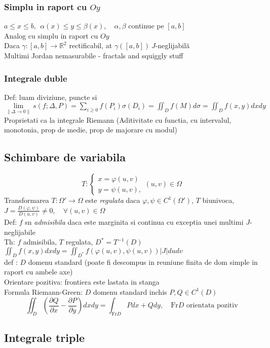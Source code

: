 \documentclass{article}
\newcommand{\parti}[2]{\frac{\partial #1}{ \partial #2}}
\newcommand*{\R}{\mathbb{R}}
\begin{document}
\subsubsection*{Simplu in raport cu $Oy$}
$ a\le x \le b,\ \ \alpha(x)\le y \le \beta(x), \quad \alpha, \beta $ continue pe $[a, b]$ \\
Analog cu simplu in raport cu $Oy$\\
Daca $\gamma: [a, b] \to \R^2$ rectificabil, at $\gamma([a, b])\ J$-neglijabilă\\
Multimi Jordan nemasurabile - fractals and squiggly stuff
\subsubsection*{Integrale duble}
Def: luam diviziune, puncte si $\displaystyle \lim\limits_{\|\Delta\to 0\|}s(f;\Delta, P) = \sum_{i\ge 0} f(P_i)\sigma(D_i)=\iint_Df(M)d\sigma=\iint_Df(x,y)dxdy$\\
Proprietati ca la integrale Riemann
(Aditivitate cu functia, cu intervalul, monotonia, prop de medie, prop de majorare cu modul)
\subsection*{Schimbare de variabila}
\[
  T: \begin{cases}
    x = \varphi(u, v)\\
    y = \psi(u, v),
  \end{cases}
   (u, v) \in \Omega
\]
Transformarea $T:\Omega'\to\Omega$ este \emph{regulata} daca $\varphi, \psi \in C^1(\Omega')$, $T$ biunivoca, $J = \frac{D(\varphi, \psi)}{D(u, v)} \neq 0, \quad
\forall (u, v) \in \Omega$\\
Def: $f$ sn \emph{admisibila} daca este marginita si continua cu exceptia unei multimi $J$-neglijabile\\
Th: $f$ admisibila, $T$ regulata, $D^* = T^{-1}(D)$\quad $\displaystyle \iint_D f(x, y) dxdy = \iint_{D^*} f(\varphi(u, v), \psi(u, v))|J| du dv $\\
def : $D$ domenu standard (poate fi descompus in reuniune finita de dom simple in raport cu ambele axe)\\
Orientare pozitiva: frontiera este lastata in stanga\\ 
Formula Riemann-Green: $D$ domenu standard inchis $P, Q \in C^1(D)$
\[\iint_D \left( \parti{Q}{x} - \parti{P}{y} \right) dx dy = \int_{\mathrm{Fr}D} Pdx+Qdy, \quad \mathrm{Fr}D \text{  orientata pozitiv} \]
\subsection*{Integrale triple}
\end{document}
